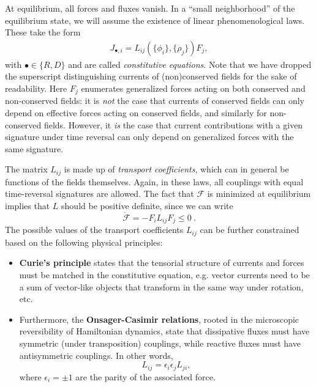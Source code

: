 At equilibrium, all forces and fluxes vanish.
In a ``small neighborhood'' of the equilibrium state, we will assume the existence of linear phenomenological laws.
These take the form
%
\begin{align}
    J_{\bullet,i}
    = L_{ij}(\{\phi_i\}, \{\rho_j\}) F_j, 
\end{align}
%
with $\bullet \in \{R,D\}$ and are called \emph{constitutive equations}. Note that we have dropped the superscript distinguishing currents of (non)conserved fields for the sake of readability.
Here $F_j$ enumerates generalized forces acting on both conserved and non-conserved fields: it is \emph{not} the case that currents of conserved fields can only depend on effective forces acting on conserved fields, and similarly for non-conserved fields. However, it \emph{is} the case that current contributions with a given signature under time reversal can only depend on generalized forces with the same signature. 

The matrix $L_{ij}$ is made up of \emph{transport coefficients}, which can in general be functions of the fields themselves.
Again, in these laws, all couplings with equal time-reversal signatures are allowed.
The fact that $\mathcal{F}$ is minimized at equilibrium implies that $L$ should be positive definite, since we can write
\begin{equation}
    \dot{\mathcal{F}} = - F_i L_{ij} F_j \leq 0~.
\end{equation}
The possible values of the transport coefficients $L_{ij}$ can be further constrained based on the following physical principles:
\begin{itemize}
    \item {\bf Curie's principle} states that the tensorial structure of currents and forces must be matched in the constitutive equation, e.g. vector currents need to be a sum of vector-like objects that transform in the same way under rotation, etc.
    \item Furthermore, the {\bf  Onsager-Casimir relations}, rooted in the microscopic reversibility of Hamiltonian dynamics, state that dissipative fluxes must have symmetric (under transposition) couplings, while reactive fluxes must have antisymmetric couplings.
    In other words,
    \begin{equation}
        L_{ij}  = \epsilon_i \epsilon_j L_{ji},
    \end{equation}
    where $\epsilon_i = \pm 1$ are the parity of the associated force.
\end{itemize}

